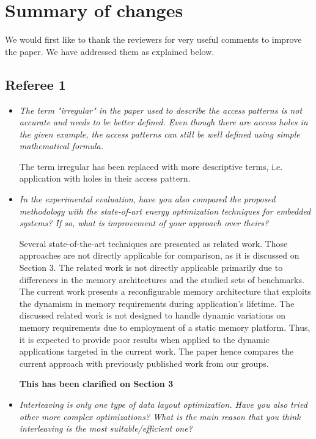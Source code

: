 \documentclass[12pt,a4paper,notitlepage]{article}
\author{Iason}
\begin{document}
\section*{Summary of changes}

We would first like to thank the reviewers for very useful comments to improve the paper. We have addressed them as explained below.

\subsection*{Referee 1}

\begin{itemize}

\item \textit{The term "irregular" in the paper used to describe the access patterns is not accurate and needs to be better defined. Even though there are access holes in the given example, the access patterns can still be well defined using simple mathematical formula.}

The term irregular has been replaced with more descriptive terms, i.e. application with holes in their access pattern.

\item \textit{In the experimental evaluation, have you also compared the proposed methodology with the state-of-art energy optimization techniques for embedded systems? If so, what is improvement of your approach over theirs?}

Several state-of-the-art techniques are presented as related work. 
Those approaches are not directly applicable for comparison, as it is discussed on Section 3.
The related work is not directly applicable primarily due to differences in the memory architectures and the studied sets of benchmarks. 
The current work presents a reconfigurable memory architecture that exploits the dynamism in memory requirements during application's lifetime.
The discussed related work is not designed to handle dynamic variations on memory requirements due to employment of a static memory platform. 
Thus, it is expected to provide poor results when applied to the dynamic applications targeted in the current work.
The paper hence compares the current approach with previously published work from our groups.

\textbf{This has been clarified on Section 3}

\item \textit{Interleaving is only one type of data layout optimization. Have you also tried other more complex optimizations? What is the main reason that you think interleaving is the most suitable/efficient one?}


\end{itemize}
\end{document}

